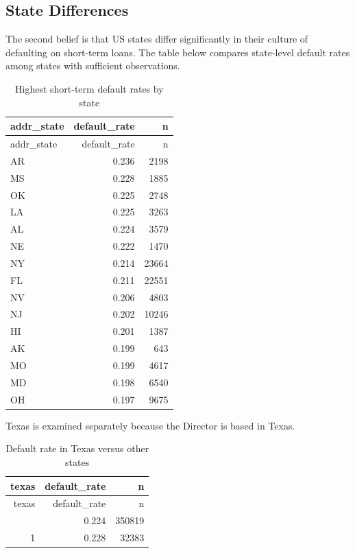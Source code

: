 \documentclass[11pt,preprint]{elsarticle}
\numberwithin{equation}{section}
\numberwithin{figure}{section}
\numberwithin{table}{section}
\begin{document}
\subsection{State Differences}\label{state-differences}

The second belief is that US states differ significantly in their
culture of defaulting on short-term loans. The table below compares
state-level default rates among states with sufficient observations.

\begin{longtable}[]{@{}lrr@{}}
\caption{Highest short-term default rates by state}\tabularnewline
\toprule\noalign{}
addr\_state & default\_rate & n \\
\midrule\noalign{}
\endfirsthead
\toprule\noalign{}
addr\_state & default\_rate & n \\
\midrule\noalign{}
\endhead
\bottomrule\noalign{}
\endlastfoot
AR & 0.236 & 2198 \\
MS & 0.228 & 1885 \\
OK & 0.225 & 2748 \\
LA & 0.225 & 3263 \\
AL & 0.224 & 3579 \\
NE & 0.222 & 1470 \\
NY & 0.214 & 23664 \\
FL & 0.211 & 22551 \\
NV & 0.206 & 4803 \\
NJ & 0.202 & 10246 \\
HI & 0.201 & 1387 \\
AK & 0.199 & 643 \\
MO & 0.199 & 4617 \\
MD & 0.198 & 6540 \\
OH & 0.197 & 9675 \\
\end{longtable}

Texas is examined separately because the Director is based in Texas.

\begin{longtable}[]{@{}rrr@{}}
\caption{Default rate in Texas versus other states}\tabularnewline
\toprule\noalign{}
texas & default\_rate & n \\
\midrule\noalign{}
\endfirsthead
\toprule\noalign{}
texas & default\_rate & n \\
\midrule\noalign{}
\endhead
\bottomrule\noalign{}
\endlastfoot
0 & 0.224 & 350819 \\
1 & 0.228 & 32383 \\
\end{longtable}
\end{document}
